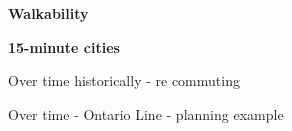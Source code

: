 \documentclass[aspectratio=169]{beamer}
\begin{document}
\begin{frame}
	
	\textbf{Walkability}
	
	
	
\end{frame}



\begin{frame}
	
	\textbf{15-minute cities}
	
	
	
\end{frame}




\begin{frame}
	
	Over time historically - re commuting
	
\end{frame}



\begin{frame}
	
	Over time - Ontario Line - planning example
	
\end{frame}
\end{document}
